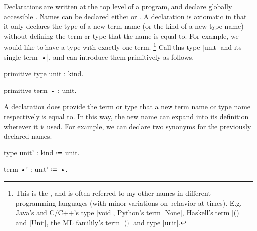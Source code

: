 \newparagraph
Declarations are written at the top level of a program, and declare globally accessible .
Names can be declared either  or .
A  declaration is axiomatic in that it only declares the type of a new term name (or the kind of a new type name) without defining the term or type that the name is equal to.
For example, we would like to have a type with exactly one term.%
\footnote{
  This is the , and is often referred to my other names in different programming languages (with minor variations on behavior at times).
  E.g. Java's and C/C++'s type \code|void|, Python's term \code|None|, Haskell's term \code|()| and \code|Unit|, the ML familily's term \code|()| and type \code|unit|.
}
Call this type \code|unit| and its single term \code|•|, and can introduce them primitively as follows.
%
\begin{snippet}
primitive type unit : kind.

primitive term • : unit.
\end{snippet}
%
A  declaration does provide the term or type that a new term name or type name respectively is equal to.
In this way, the new name can expand into its definition wherever it is used.
For example, we can declare two synonyms for the previously declared names.
%
\begin{snippet}
type unit' : kind ≔ unit.

term •' : unit' ≔ •.
\end{snippet}

